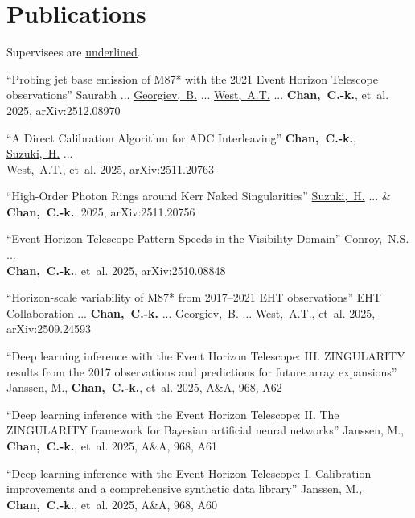 \section*{Publications}

\newcommand\mm[1]{\ul{#1}} %
Supervisees are \mm{underlined}.

\newcommand\sm{} %

\vspace{6pt}

\begin{ilist}

\item ``Probing jet base emission of M87* with the 2021 Event Horizon Telescope observations''
  Saurabh ... \mm{Georgiev,~B.} ... \mm{West,~A.T.} ... \textbf{Chan,~C.-k.}, et~al.
  2025, arXiv:2512.08970

\item \sm``A Direct Calibration Algorithm for ADC Interleaving''
  \textbf{Chan,~C.-k.}, \mm{Suzuki,~H.} ...\\\mm{West,~A.T.}, et~al.
  2025, arXiv:2511.20763

\item ``High-Order Photon Rings around Kerr Naked Singularities''
  \mm{Suzuki,~H.} ... \& \textbf{Chan,~C.-k.}.
  2025, arXiv:2511.20756

\item ``Event Horizon Telescope Pattern Speeds in the Visibility Domain''
  Conroy,~N.S. ...\\ \textbf{Chan,~C.-k.}, et~al.
  2025, arXiv:2510.08848

\item ``Horizon-scale variability of M87* from 2017--2021 EHT observations''
  EHT Collaboration ... \textbf{Chan,~C.-k.} ... \mm{Georgiev,~B.} ... \mm{West,~A.T.}, et~al.
  2025, arXiv:2509.24593

\item ``Deep learning inference with the Event Horizon Telescope: III. ZINGULARITY results from the 2017 observations and predictions for future array expansions''
  Janssen, M., \textbf{Chan,~C.-k.}, et~al.
  2025, A\&A, 968, A62

\item ``Deep learning inference with the Event Horizon Telescope: II. The ZINGULARITY framework for Bayesian artificial neural networks''
  Janssen, M., \textbf{Chan,~C.-k.}, et~al.
  2025, A\&A, 968, A61

\item ``Deep learning inference with the Event Horizon Telescope: I. Calibration improvements and a comprehensive synthetic data library''
  Janssen, M., \textbf{Chan,~C.-k.}, et~al.
  2025, A\&A, 968, A60


\end{ilist}

